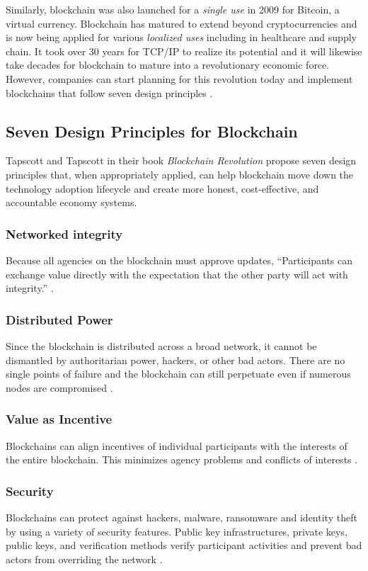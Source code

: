 \documentclass[sigconf]{acmart}
\begin{document}
Similarly, blockchain was also launched for a \textit{single use} in 2009 for Bitcoin, a virtual currency. Blockchain has matured to extend beyond cryptocurrencies and is now being applied for various \textit{localized uses} including in healthcare and supply chain. It took over 30 years for TCP/IP to realize its potential and it will likewise take decades for blockchain to mature into a revolutionary economic force. However, companies can start planning for this revolution today and implement blockchains that follow seven design principles \cite{hbr} \cite{tapscott}.

\subsection{Seven Design Principles for Blockchain}
Tapscott and Tapscott \cite{tapscott} in their book \textit{Blockchain Revolution} propose seven design principles that, when appropriately applied, can help blockchain move down the technology adoption lifecycle and create more honest, cost-effective, and accountable economy systems.

\subsubsection{Networked integrity} Because all agencies on the blockchain must approve updates, ``Participants can exchange value directly with the expectation that the other party will act with integrity.'' \cite{tapscott}. 

\subsubsection{Distributed Power} Since the blockchain is distributed across a broad network, it cannot be dismantled by authoritarian power, hackers, or other bad actors. There are no single points of failure and the blockchain can still perpetuate even if numerous nodes are compromised \cite{tapscott}.

\subsubsection{Value as Incentive} Blockchains can align incentives of individual participants with the interests of the entire blockchain. This minimizes agency problems and conflicts of interests \cite{tapscott}.

\subsubsection{Security} Blockchains can protect against hackers, malware, ransomware and identity theft by using a variety of security features. Public key infrastructures, private keys, public keys, and verification methods verify participant activities and prevent bad actors from overriding the network \cite{tapscott}. 
\end{document}
